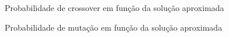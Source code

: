 \documentclass[a4paper, 11pt]{article}
\begin{document}
      \begin{figure}[H]
        \caption{\label{fig:my-label} Probabilidade de crossover em função da solução aproximada}
      \end{figure} 

      \begin{figure}[H]
        \caption{\label{fig:my-label} Probabilidade de mutação em função da solução aproximada}
      \end{figure} 
\end{document}
